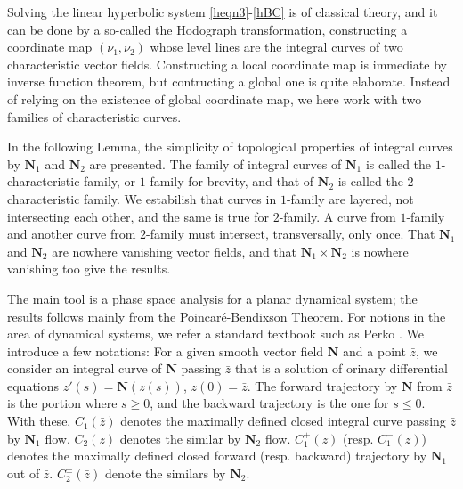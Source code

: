 \documentclass[11pt]{amsart}
\theoremstyle{plain}
\theoremstyle{remark}
\numberwithin{equation}{section}
\numberwithin{Thm}{section}
\def\N{{\mathbf N}}
\begin{document}
Solving the linear hyperbolic system \eqref{heqn3}-\eqref{hBC} is of classical theory, and it can be done by a so-called the Hodograph transformation, constructing a coordinate map $(\nu_1,\nu_2)$ whose level lines are the integral curves of two characteristic vector fields. Constructing a local coordinate map is immediate by inverse function theorem, but contructing a global one is quite elaborate. Instead of relying on the existence of global coordinate map, we here work with two families of characteristic curves. 

In the following Lemma, the simplicity of topological properties of integral curves by $\N_1$ and $\N_2$ are presented. The family of integral curves of $\N_1$ is called the $1$-characteristic family, or $1$-family for brevity, and that of $\N_2$ is called the $2$-characteristic family. We estabilish that curves in $1$-family are layered, not intersecting each other, and the same is true for $2$-family. A curve from $1$-family and another curve from $2$-family must intersect, transversally, only once. That $\N_1$ and $\N_2$ are nowhere vanishing vector fields, and that $\N_1\times \N_2$ is nowhere vanishing too give the results.

The main tool is a phase space analysis for a planar dynamical system; the results follows mainly from the Poincar\'e-Bendixson Theorem. For notions in the area of dynamical systems, we refer a standard textbook such as Perko \cite{perko_differential_2001}.  We introduce a few notations: For a given smooth vector field $\N$ and a point $\bar z$, we consider an integral curve of $\N$ passing $\bar z$ that is a solution of orinary differential equations $z'(s) = \N(z(s))$, $z(0)=\bar z$. The forward trajectory by $\N$ from $\bar{z}$ is the portion where $s\ge0$, and the backward trajectory is the one for $s\le0$. With these, $C_1(\bar z)$ denotes the maximally defined closed integral curve passing $\bar z$ by $\N_1$ flow. $C_2(\bar z)$ denotes the similar by $\N_2$ flow. $C^+_1(\bar z)$ (resp. $C^-_1(\bar z)$) denotes the maximally defined closed forward (resp. backward) trajectory by $\N_1$ out of $\bar z$. $C^\pm_2(\bar z)$ denote the similars by $\N_2$. 
\end{document}
